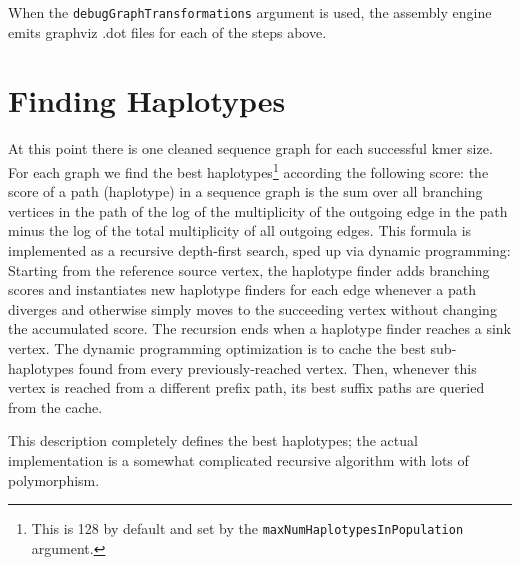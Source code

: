 \documentclass[nofootinbib,amssymb,amsmath]{revtex4}
\newcommand{\code}[1]{\texttt{#1}}
\begin{document}
When the \code{debugGraphTransformations} argument is used, the assembly engine emits graphviz .dot files for each of the steps above.

\section{Finding Haplotypes} \label{finding-haplotypes}
At this point there is one cleaned sequence graph for each successful kmer size.  For each graph we find the best haplotypes\footnote{This is 128 by default and set by the \code{maxNumHaplotypesInPopulation} argument.} according the following score: the score of a path (haplotype) in a sequence graph is the sum over all branching vertices in the path of the log of the multiplicity of the outgoing edge in the path minus the log of the total multiplicity of all outgoing edges.  This formula is implemented as a recursive depth-first search, sped up via dynamic programming: Starting from the reference source vertex, the haplotype finder adds branching scores and instantiates new haplotype finders for each edge whenever a path diverges and otherwise simply moves to the succeeding vertex without changing the accumulated score.  The recursion ends when a haplotype finder reaches a sink vertex.  The dynamic programming optimization is to cache the best sub-haplotypes found from every previously-reached vertex.  Then, whenever this vertex is reached from a different prefix path, its best suffix paths are queried from the cache.


This description completely defines the best haplotypes; the actual implementation is a somewhat complicated recursive algorithm with lots of polymorphism.
\end{document}
